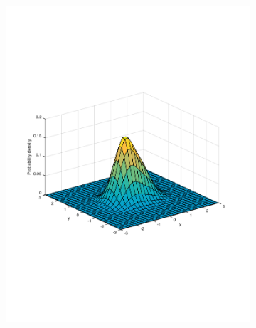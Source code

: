 \documentclass[preprint, 12pt]{elsarticle}
\begin{document}
\begin{figure}[htp!]
	\caption{Example of market where the left subpopulation is twice as large as the right ($n_l/n_r = 2$) and the polarisation of the mean ideal points is respectively $\mu = 0.5$ (left) and $\mu = 1.5$ (right).}
	\centering
	\begin{subfigure}[t]{0.485\textwidth}
		\includegraphics[width=\textwidth, trim={15mm 90mm 20mm 70mm}]{Graphics/distribution_mu05_nratio2.pdf}
		\caption{}
		\label{fig:surface_mu05}
	\end{subfigure}
	~
	\begin{subfigure}[t]{0.485\textwidth}

\end{subfigure}
\end{figure}
\end{document}
